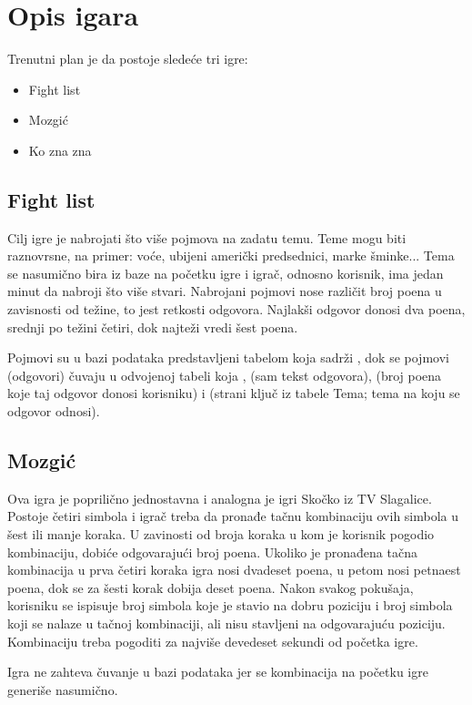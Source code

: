 \documentclass{article}
\begin{document}
\section{Opis igara}
Trenutni plan je da postoje sledeće tri igre:
\begin{itemize}
    \item Fight list
    \item Mozgić
    \item Ko zna zna
\end{itemize}
\subsection{Fight list}
Cilj igre je nabrojati što više pojmova na zadatu temu. Teme mogu biti raznovrsne, na 
primer: voće, ubijeni američki predsednici, marke šminke... Tema se nasumično bira iz baze na 
početku igre i igrač, odnosno korisnik, ima jedan minut da nabroji što više stvari. Nabrojani 
pojmovi nose različit broj poena u zavisnosti od težine, to jest retkosti odgovora. Najlakši 
odgovor donosi dva poena, srednji po težini četiri, dok najteži vredi šest poena.
\par Pojmovi su u bazi podataka predstavljeni tabelom koja sadrži , dok se 
pojmovi (odgovori) čuvaju u odvojenoj tabeli koja ,  (sam tekst odgovora), 
(broj poena koje taj odgovor donosi korisniku) i  (strani ključ iz tabele Tema; tema 
na koju se odgovor odnosi).
\subsection{Mozgić}
Ova igra je poprilično jednostavna i analogna je igri Skočko iz TV Slagalice. Postoje četiri 
simbola i igrač treba da pronađe tačnu kombinaciju ovih simbola u šest ili manje koraka. U 
zavinosti od broja koraka u kom je korisnik pogodio kombinaciju, dobiće odgovarajući broj 
poena. Ukoliko je pronađena tačna kombinacija u prva četiri koraka igra nosi dvadeset poena, u 
petom nosi petnaest poena, dok se za šesti korak dobija deset poena. Nakon svakog pokušaja, 
korisniku se ispisuje broj simbola koje je stavio na dobru poziciju i broj simbola koji se nalaze u 
tačnoj kombinaciji, ali nisu stavljeni na odgovarajuću poziciju. Kombinaciju treba pogoditi za 
najviše devedeset sekundi od početka igre.
\par Igra ne zahteva čuvanje u bazi podataka jer se kombinacija na početku igre generiše 
nasumično.
\newpage
\end{document}
